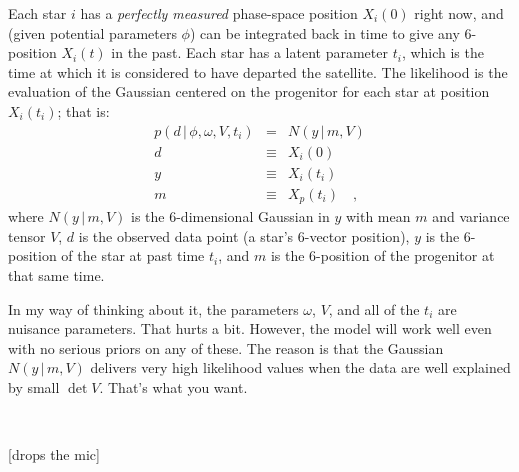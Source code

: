 \documentclass[12pt,letterpaper]{article}
\newcommand{\given}{\,|\,}
\begin{document}
Each star $i$ has a \emph{perfectly measured} phase-space position $X_i(0)$ right now,
and (given potential parameters $\phi$) can be integrated back in time to give any 6-position $X_i(t)$ in the past.
Each star has a latent parameter $t_i$,
which is the time at which it is considered to have departed the satellite.
The likelihood is the evaluation of the Gaussian centered on the progenitor for each star at position $X_i(t_i)$;
that is:
\begin{eqnarray}
p(d\given \phi,\omega,V,t_i) &=& N(y\given m,V)
\\
d &\equiv& X_i(0)
\\
y &\equiv& X_i(t_i)
\\
m &\equiv& X_p(t_i)
\quad ,
\end{eqnarray}
where
$N(y\given m,V)$ is the 6-dimensional Gaussian in $y$ with mean $m$ and variance tensor $V$,
$d$ is the observed data point (a star's 6-vector position),
$y$ is the 6-position of the star at past time $t_i$,
and $m$ is the 6-position of the progenitor at that same time.

In my way of thinking about it,
the parameters $\omega$, $V$, and all of the $t_i$ are nuisance parameters.
That hurts a bit.
However, the model will work well even with no serious priors on any of these.
The reason is that the Gaussian $N(y\given m,V)$ delivers very high likelihood values
when the data are well explained by small $\det V$.
That's what you want.

~

[drops the mic]
\end{document}
